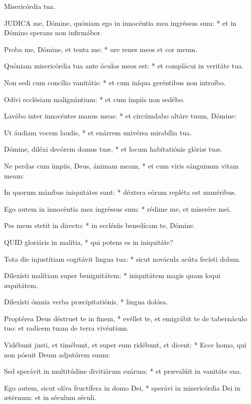  Misericórdia tua.


\lettrine[lines=2]{J}{UDICA} me, Dómine, quóniam ego in innocéntia mea ingréssus sum: * et in Dómino sperans non infirmábor.

Proba me, Dómine, et tenta me: * ure renes meos et cor meum.

Quóniam misericórdia tua ante óculos meos est: * et complácui in veritáte tua.

Non sedi cum concílio vanitátis: * et cum iníqua geréntibus non introíbo.

Odívi ecclésiam malignántium: * et cum ímpiis non sedébo.

Lavábo inter innocéntes manus meas: * et circúmdabo altáre tuum, Dómine:

Ut áudiam vocem laudis, * et enárrem univérsa mirabília tua.

Dómine, diléxi decórem domus tuæ, * et locum habitatiónis glóriæ tuæ.

Ne perdas cum ímpiis, Deus, ánimam meam, * et cum viris sánguinum vitam meam:

In quorum mánibus iniquitátes sunt: * déxtera eórum repléta est munéribus.

Ego autem in innocéntia mea ingréssus sum: * rédime me, et miserére mei.

Pes meus stetit in directo: * in ecclésiis benedícam te, Dómine.


\lettrine[lines=2]{Q}{UID} gloriáris in malítia, * qui potens es in iniquitáte?

Tota die injustítiam cogitávit lingua tua: * sicut novácula acúta fecísti dolum.

Dilexísti malítiam super benignitátem: * iniquitátem magis quam loqui æquitátem.

Dilexísti ómnia verba præcipitatiónis, * lingua dolósa.

Proptérea Deus déstruet te in finem, * evéllet te, et emigrábit te de tabernáculo tuo: et radícem tuam de terra vivéntium.

Vidébunt justi, et timébunt, et super eum ridébunt, et dicent: * Ecce homo, qui non pósuit Deum adjutórem suum:

Sed sperávit in multitúdine divitiárum suárum: * et prævalúit in vanitáte sua.

Ego autem, sicut olíva fructífera in domo Dei, * sperávi in misericórdia Dei in ætérnum: et in séculum séculi.

